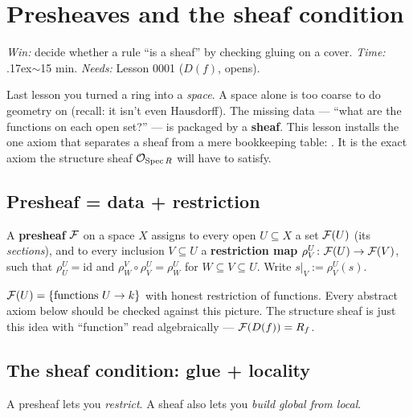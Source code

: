 \chapter{Presheaves and the sheaf condition}\label{ch:ch02-presheaves}

\noindent\textit{Win:} decide whether a rule ``is a sheaf'' by checking gluing on a cover.\quad
\textit{Time:} {\raise.17ex\hbox{$\scriptstyle\sim$}}15 min.\quad
\textit{Needs:} Lesson 0001 ($D(f)$, opens).

\medskip

Last lesson you turned a ring into a \emph{space}. A space alone is too coarse to do geometry on
(recall: it isn't even Hausdorff). The missing data --- ``what are the functions on each open
set?'' --- is packaged by a \textbf{sheaf}. This lesson installs the one axiom that separates a
sheaf from a mere bookkeeping table: . It is the exact axiom the structure sheaf
$\mathcal{O}_{\operatorname{Spec} R}$ will have to satisfy.

\section{Presheaf = data + restriction}

\begin{defbox}
A \textbf{presheaf} $\mathcal{F}$ on a space $X$ assigns to every open $U\subseteq X$ a set $\mathcal{F}(U)$ (its
\emph{sections}), and to every inclusion $V\subseteq U$ a \textbf{restriction map}
$\rho^U_V\colon \mathcal{F}(U)\to\mathcal{F}(V)$, such that $\rho^U_U=\mathrm{id}$ and
$\rho^V_W\circ\rho^U_V=\rho^U_W$ for $W\subseteq V\subseteq U$. Write
$s|_V:=\rho^U_V(s)$.
\end{defbox}

\begin{intubox}
$\mathcal{F}(U)=\{\text{functions } U\to k\}$ with honest restriction of functions. Every abstract axiom
below should be checked against this picture. The structure sheaf is just this idea with
``function'' read algebraically --- $\mathcal{F}(D(f))=R_f$.
\end{intubox}

\section{The sheaf condition: glue + locality}
A presheaf lets you \emph{restrict}. A sheaf also lets you \emph{build global from local}.


